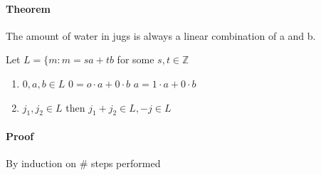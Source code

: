 \documentclass[9pt, letterpaper, oneside]{article}
\begin{document}
\paragraph{Theorem} The amount of water in jugs is always a linear combination of a and b.

Let $L = \{m : m = sa+tb$ for some $s, t \in \mathbb{Z}$

\begin{enumerate}
    \item $0, a, b \in L$
		$0 = o \cdot a + 0 \cdot b$
		$a = 1 \cdot a + 0 \cdot b$
	\item $j_1, j_2 \in L$ then $j_1 + j_2 \in L, -j \in L$\\
\end{enumerate}

\paragraph{Proof}
By induction on \# steps performed
\end{document}
